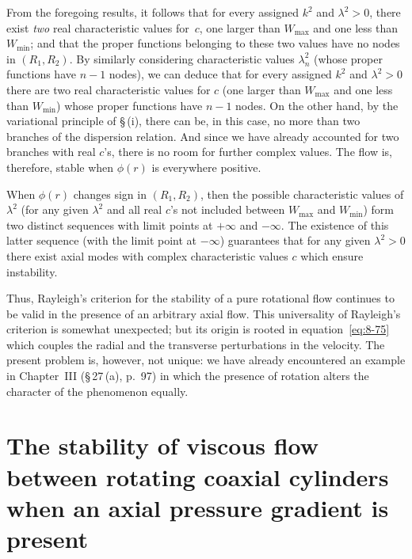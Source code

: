 From the foregoing results, it follows that for every assigned $k^2$ and $\lambda^2 > 0$, there exist \emph{two} real characteristic values for~$c$, one larger than $W_{\max}$ and one less than $W_{\min}$; and that the proper functions belonging to these two values have no nodes in $(R_1, R_2)$. By similarly considering characteristic values $\lambda_n^2$ (whose proper functions have $n-1$ nodes), we can deduce that for every assigned $k^2$ and $\lambda^2 > 0$ there are two real characteristic values for $c$ (one larger than $W_{\max}$ and one less than $W_{\min}$) whose proper functions have $n-1$ nodes. On the other hand, by the variational principle of \S\,(i), there can be, in this case, no more than two branches of the dispersion relation. And since we have already accounted for two branches with real $c$'s, there is no room for further complex values. The flow is, therefore, stable when $\phi(r)$ is everywhere positive.

When $\phi(r)$ changes sign in $(R_1, R_2)$, then the possible characteristic values of $\lambda^2$ (for any given $\lambda^2$ and all real $c$'s not included between $W_{\max}$ and $W_{\min}$) form two distinct sequences with limit points at $+\infty$ and $-\infty$. The existence of this latter sequence (with the limit point at $-\infty$) guarantees that for any given $\lambda^2 > 0$ there exist axial modes with complex characteristic values $c$ which ensure instability.

Thus, Rayleigh's criterion for the stability of a pure rotational flow continues to be valid in the presence of an arbitrary axial flow. This universality of Rayleigh's criterion is somewhat unexpected; but its origin is rooted in equation~\eqref{eq:8-75} which couples the radial and the transverse perturbations in the velocity. The present problem is, however, not unique: we have already encountered an example in Chapter~III (\S\,27\,(a), p.~97) in which the presence of rotation alters the character of the phenomenon equally.

\section{The stability of viscous flow between rotating coaxial cylinders when an axial pressure gradient is present}
\label{sec:79}

